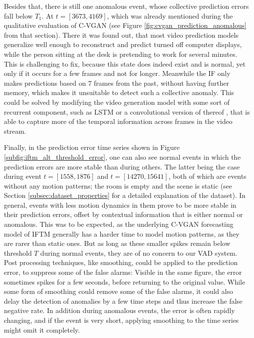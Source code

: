 Besides that, there is still one anomalous event, whose collective prediction errors fall below $T_1$. At $t=[3673,4169]$, which was already mentioned during the qualitative evaluation of C-VGAN (see Figure \ref{fig:cvgan_prediction_anomalous} from that section). There it was found out, that most video prediction models generalize well enough to reconstruct and predict turned off computer displays, while the person sitting at the desk is pretending to work for several minutes. This is challenging to fix, because this state does indeed exist and is normal, yet only if it occurs for a few frames and not for longer. Meanwhile the IF only makes predictions based on $7$ frames from the past, without having further memory, which makes it unsuitable to detect such a collective anomaly. This could be solved by modifying the video generation model with some sort of recurrent component, such as LSTM \cite{hochreiter1997long} or a convolutional version of thereof \cite{shi2015convolutional}, that is able to capture more of the temporal information across frames in the video stream.

Finally, in the prediction error time series shown in Figure \ref{subfig:iftm_alt_threshold_error}, one can also see normal events in which the prediction errors are more stable than during others. The latter being the case during event $t=[1558,1876]$ and $t=[14270,15641]$, both of which are events without any motion patterns; the room is empty and the scene is static (see Section \ref{subsec:dataset_properties} for a detailed explanation of the dataset). In general, events with less motion dynamics in them prove to be more stable in their prediction errors, offset by contextual information that is either normal or anomalous. This was to be expected, as the underlying C-VGAN forecasting model of IFTM generally has a harder time to model motion patterns, as they are rarer than static ones. But as long as these smaller spikes remain below threshold $T$ during normal events, they are of no concern to our VAD system. Post processing techniques, like smoothing, could be applied to the prediction error, to suppress some of the false alarms: Visible in the same figure, the error sometimes spikes for a few seconds, before returning to the original value. While some form of smoothing could remove some of the false alarms, it could also delay the detection of anomalies by a few time steps and thus increase the false negative rate. In addition during anomalous events, the error is often rapidly changing, and if the event is very short, applying smoothing to the time series might omit it completely.